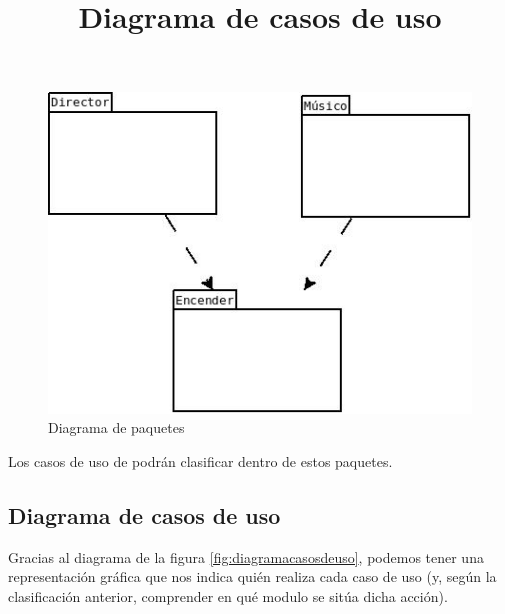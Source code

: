 \begin{figure}[!htb]
\centering
\includegraphics[width=1\textwidth]{./imagenes/diagramapaquetes}
\caption{Diagrama de paquetes} \label{fig:diagramapaquetes}
\end{figure}

Los casos de uso de podrán clasificar dentro de estos paquetes.

\subsection{Diagrama de casos de uso}
\title{Diagrama de casos de uso}
Gracias al diagrama de la figura \ref{fig:diagramacasosdeuso}, podemos tener una representación gráfica que nos
indica quién realiza cada caso de uso (y, según la clasificación anterior,
comprender en qué modulo se sitúa dicha acción).\\

